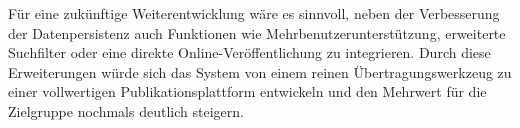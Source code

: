 Für eine zukünftige Weiterentwicklung wäre es sinnvoll, neben der Verbesserung der Datenpersistenz auch Funktionen 
wie Mehrbenutzerunterstützung, erweiterte Suchfilter oder eine direkte Online-Veröffentlichung zu integrieren. 
Durch diese Erweiterungen würde sich das System von einem reinen Übertragungswerkzeug zu einer vollwertigen 
Publikationsplattform entwickeln und den Mehrwert für die Zielgruppe nochmals deutlich steigern.
